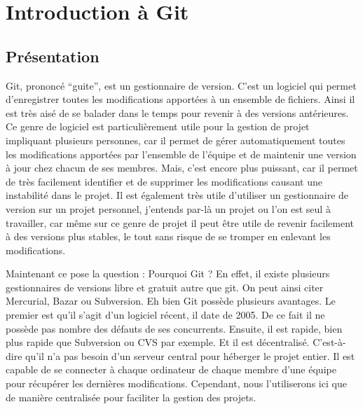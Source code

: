\documentclass[a4paper]{article}
\begin{document}
\section{Introduction à Git}

\subsection{Présentation}

Git, prononcé “guite”, est un gestionnaire de version. C'est un logiciel qui permet d'enregistrer toutes les modifications apportées à un ensemble de fichiers. Ainsi il est très aisé de se \og balader dans le temps \fg pour revenir à des versions antérieures. Ce genre de logiciel est particulièrement utile pour la gestion de projet impliquant plusieurs personnes, car il permet de gérer automatiquement toutes les modifications apportées par l'ensemble de l'équipe et de maintenir une version à jour chez chacun de ses membres. Mais, c'est encore plus puissant, car il permet de très facilement identifier et de supprimer les modifications causant une instabilité dans le projet. Il est également très utile d'utiliser un gestionnaire de version sur un projet personnel, j'entends par-là un projet ou l'on est seul à travailler, car même sur ce genre de projet il peut être utile de revenir facilement à des versions plus stables, le tout sans risque de se tromper en enlevant les modifications.

Maintenant ce pose la question : Pourquoi Git ? En effet, il existe plusieurs gestionnaires de versions libre et gratuit autre que git. On peut ainsi citer Mercurial, Bazar ou Subversion. Eh bien Git possède plusieurs avantages. Le premier est qu'il s'agit d'un logiciel récent, il date de 2005. De ce fait il ne possède pas nombre des défauts de ses concurrents. Ensuite, il est rapide, bien plus rapide que Subversion ou CVS par exemple. Et il est décentralisé. C'est-à-dire qu'il n'a pas besoin d'un serveur central pour héberger le projet entier. Il est capable de se connecter à chaque ordinateur de chaque membre d'une équipe pour récupérer les dernières modifications. Cependant, nous l'utiliserons ici que de manière centralisée pour faciliter la gestion des projets.
\end{document}
